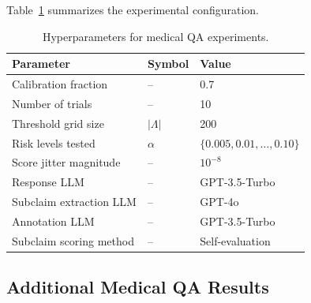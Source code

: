 Table~\ref{tab:medqa_hyperparameters} summarizes the experimental configuration.

\begin{table}[h]
\centering
\caption{Hyperparameters for medical QA experiments.}
\label{tab:medqa_hyperparameters}
\begin{tabular}{lll}
\toprule
\textbf{Parameter} & \textbf{Symbol} & \textbf{Value} \\
\midrule
Calibration fraction & -- & 0.7 \\
Number of trials & -- & 10 \\
Threshold grid size & $|\Lambda|$ & 200 \\
Risk levels tested & $\alpha$ & $\{0.005, 0.01, \ldots, 0.10\}$ \\
Score jitter magnitude & -- & $10^{-8}$ \\
Response LLM & -- & GPT-3.5-Turbo \\
Subclaim extraction LLM & -- & GPT-4o \\
Annotation LLM & -- & GPT-3.5-Turbo \\
Subclaim scoring method & -- & Self-evaluation \\
\bottomrule
\end{tabular}
\end{table}


\subsection{Additional Medical QA Results}
\label{app:med_QA_add_results}



